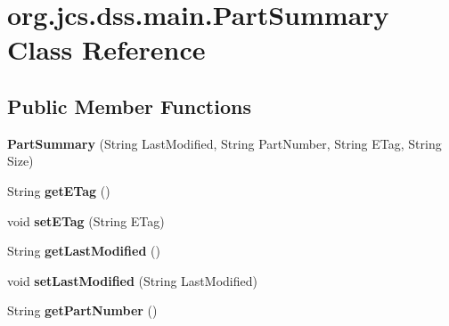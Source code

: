 \hypertarget{classorg_1_1jcs_1_1dss_1_1main_1_1PartSummary}{}\section{org.\+jcs.\+dss.\+main.\+Part\+Summary Class Reference}
\label{classorg_1_1jcs_1_1dss_1_1main_1_1PartSummary}
\subsection*{Public Member Functions}
\begin{DoxyCompactItemize}
\item 
{\bfseries Part\+Summary} (String Last\+Modified, String Part\+Number, String E\+Tag, String Size)\hypertarget{classorg_1_1jcs_1_1dss_1_1main_1_1PartSummary_ac2707032d67ac6f2a9dd7637a0e72473}{}\label{classorg_1_1jcs_1_1dss_1_1main_1_1PartSummary_ac2707032d67ac6f2a9dd7637a0e72473}

\item 
String {\bfseries get\+E\+Tag} ()\hypertarget{classorg_1_1jcs_1_1dss_1_1main_1_1PartSummary_a02242db1df4b063bb74e890017a0542c}{}\label{classorg_1_1jcs_1_1dss_1_1main_1_1PartSummary_a02242db1df4b063bb74e890017a0542c}

\item 
void {\bfseries set\+E\+Tag} (String E\+Tag)\hypertarget{classorg_1_1jcs_1_1dss_1_1main_1_1PartSummary_a30882b2d780f87e0925003d497a2e2e0}{}\label{classorg_1_1jcs_1_1dss_1_1main_1_1PartSummary_a30882b2d780f87e0925003d497a2e2e0}

\item 
String {\bfseries get\+Last\+Modified} ()\hypertarget{classorg_1_1jcs_1_1dss_1_1main_1_1PartSummary_a1688671174df7b92a7244e429004b211}{}\label{classorg_1_1jcs_1_1dss_1_1main_1_1PartSummary_a1688671174df7b92a7244e429004b211}

\item 
void {\bfseries set\+Last\+Modified} (String Last\+Modified)\hypertarget{classorg_1_1jcs_1_1dss_1_1main_1_1PartSummary_a285cc3cbb9df94da270f65543b51fce9}{}\label{classorg_1_1jcs_1_1dss_1_1main_1_1PartSummary_a285cc3cbb9df94da270f65543b51fce9}

\item 
String {\bfseries get\+Part\+Number} ()\hypertarget{classorg_1_1jcs_1_1dss_1_1main_1_1PartSummary_ad67c10b3a48cbaee701cfb71f3b94b16}{}\label{classorg_1_1jcs_1_1dss_1_1main_1_1PartSummary_ad67c10b3a48cbaee701cfb71f3b94b16}


\end{DoxyCompactItemize}
